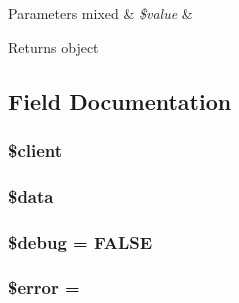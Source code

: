\begin{DoxyParams}[1]{Parameters}
mixed & {\em \$value} & \\
\hline
\end{DoxyParams}
\begin{DoxyReturn}{Returns}
object 
\end{DoxyReturn}


\subsection{Field Documentation}
\hypertarget{class_c_i___xmlrpc_ad1405dc1ba2e288764378e79bff7a87d}{}
\subsubsection[{\$client}]{\setlength{\rightskip}{0pt plus 5cm}\$client}\label{class_c_i___xmlrpc_ad1405dc1ba2e288764378e79bff7a87d}
\hypertarget{class_c_i___xmlrpc_a6efc15b5a2314dd4b5aaa556a375c6d6}{}
\subsubsection[{\$data}]{\setlength{\rightskip}{0pt plus 5cm}\$data}\label{class_c_i___xmlrpc_a6efc15b5a2314dd4b5aaa556a375c6d6}
\hypertarget{class_c_i___xmlrpc_a85ae3e64cd40e9564adceb010085e9dd}{}
\subsubsection[{\$debug}]{\setlength{\rightskip}{0pt plus 5cm}\$debug = F\+A\+L\+S\+E}\label{class_c_i___xmlrpc_a85ae3e64cd40e9564adceb010085e9dd}
\hypertarget{class_c_i___xmlrpc_aeba2ab722cedda53dbb7ec1a59f45550}{}
\subsubsection[{\$error}]{\setlength{\rightskip}{0pt plus 5cm}\$error = \textquotesingle{}\textquotesingle{}}\label{class_c_i___xmlrpc_aeba2ab722cedda53dbb7ec1a59f45550}
\hypertarget{class_c_i___xmlrpc_abf17cb2dba2ed17cb28aa5f37deb5293}{}
